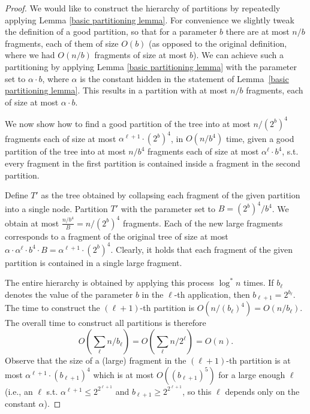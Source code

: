 \documentclass[11pt,a4paper]{article}
\theoremstyle{definition}
\theoremstyle{remark}
\begin{document}
\begin{proof}
We would like to construct the hierarchy of partitions by repeatedly applying Lemma \ref{basic partitioning lemma}. For convenience we slightly tweak  the definition of a good partition, so that for a parameter $b$ there are at most $n/b$ fragments, each of them of size $O(b)$ (as opposed to the original definition, where we had $O(n/b)$ fragments of size at most $b$). We can achieve such a partitioning by applying Lemma \ref{basic partitioning lemma} with the parameter set to $\alpha\cdot b$, where $\alpha$ is the constant hidden in the statement of Lemma~\ref{basic partitioning lemma}. This results in a partition with at most $n/b$ fragments, each of size at most $\alpha \cdot b$. 

We now show how to find a good partition of the tree into at most $n/(2^b)^{4}$ fragments each of size at most $\alpha^{\ell+1}\cdot (2^{b})^{4}$, in $O(n/b^{4})$ time, given a good partition of the tree into at most $n/b^4$ fragments each of size at most $\alpha^{\ell}\cdot b^{4}$, s.t. every fragment in the first partition is contained inside a fragment in the second partition.

Define $T'$ as the tree obtained by collapsing each fragment of the given partition into a single node. Partition $T'$ with the parameter set to $B= {(2^{b})^{4}}/{b^{4}}$. We obtain at most $\frac{n/b^4}{B}=n/(2^{b})^{4}$ fragments. Each of the new large fragments corresponds to a fragment of the original tree of size at most $\alpha\cdot \alpha^{\ell}\cdot b^{4}\cdot B = \alpha^{\ell+1}\cdot (2^{b})^{4}$. Clearly, it holds that each fragment of the given partition is contained in a single large fragment.

The entire hierarchy is obtained by applying this process $\log^{*}n$ times. 
If $b_{\ell}$ denotes the value of the parameter $b$ in the $\ell$-th application, then  $b_{\ell+1}=2^{b_{\ell}}$. The time to construct the $(\ell+1)$-th partition is $O(n/(b_{\ell})^{4})=O(n/b_{\ell})$. The overall time to construct all partitions is therefore 
$$ O(\sum_{\ell} {n}/{b_{\ell}}) = O(\sum_{\ell} {n}/{2^{\ell}}) = O(n).$$
Observe that the size of a (large) fragment in the $(\ell+1)$-th partition is at most $\alpha^{\ell+1} \cdot (b_{\ell+1})^{4}$ which is at most $O((b_{\ell+1})^5)$ for a large enough $\ell$ (i.e., an $\ell$ s.t. $\alpha^{\ell+1}\leq 2^{2^{\ell+1}}$ and $b_{\ell+1}\geq 2^{2^{\ell+1}}$, so
this $\ell$ depends only on the constant $\alpha$).

\end{proof}
 
\end{document}
